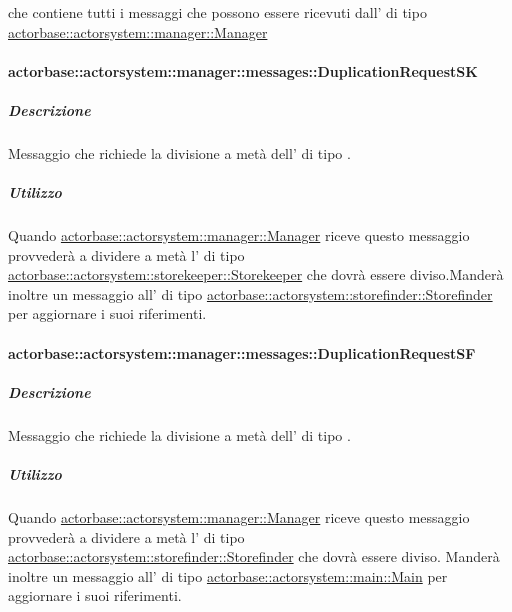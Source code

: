 \documentclass{scalatekids-article}
\begin{document}
 che contiene tutti i messaggi che possono essere ricevuti
dall' di tipo
\hyperref[sec:actorbase::actorsystem::manager::Manager]{actorbase::\allowbreak{}actorsystem::\allowbreak{}manager::\allowbreak{}Manager}

\paragraph{actorbase::actorsystem::manager::messages::DuplicationRequestSK}
\label{sec:actorbase::actorsystem::manager::messages::DuplicationRequestSK}

\subparagraph{Descrizione}

Messaggio che richiede la divisione a metà dell' di tipo
.

\subparagraph{Utilizzo}

Quando \hyperref[sec:actorbase::actorsystem::manager::Manager]{actorbase::\allowbreak{}actorsystem::\allowbreak{}manager::\allowbreak{}Manager}
riceve questo messaggio provvederà a dividere a metà l' di tipo
\hyperref[sec:actorbase::actorsystem::storekeeper::Storekeeper]{actorbase::\allowbreak{}actorsystem::\allowbreak{}storekeeper::\allowbreak{}Storekeeper}
che dovrà essere diviso.Manderà inoltre un messaggio all' di tipo
\hyperref[sec:actorbase::actorsystem::storefinder::Storefinder]{actorbase::\allowbreak{}actorsystem::\allowbreak{}storefinder::\allowbreak{}Storefinder}
per aggiornare i suoi riferimenti.

\paragraph{actorbase::actorsystem::manager::messages::DuplicationRequestSF}
\label{sec:actorbase::actorsystem::manager::messages::DuplicationRequestSF}

\subparagraph{Descrizione}

Messaggio che richiede la divisione a metà dell' di tipo
.

\subparagraph{Utilizzo}

Quando \hyperref[sec:actorbase::actorsystem::manager::Manager]{actorbase::\allowbreak{}actorsystem::\allowbreak{}manager::\allowbreak{}Manager}
riceve questo messaggio provvederà a dividere a metà l' di tipo
\hyperref[sec:actorbase::actorsystem::storefinder::Storefinder]{actorbase::\allowbreak{}actorsystem::\allowbreak{}storefinder::\allowbreak{}Storefinder}
che dovrà essere diviso. Manderà inoltre un messaggio all' di tipo
\hyperref[sec:actorbase::actorsystem::main::Main]{actorbase::\allowbreak{}actorsystem::\allowbreak{}main::\allowbreak{}Main}
per aggiornare i suoi riferimenti.
\end{document}
